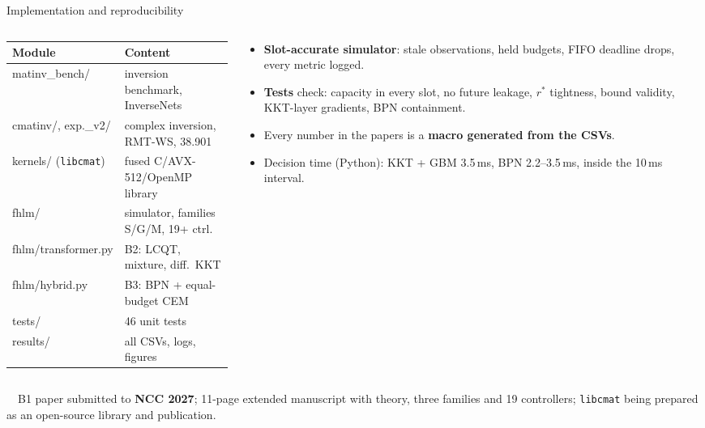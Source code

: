 \documentclass[aspectratio=169,10pt,xcolor={table,dvipsnames}]{beamer}
\newcommand{\rstar}{r^{\ast}}
\begin{document}
\begin{frame}{Implementation and reproducibility}
\begin{columns}[T]
\begin{column}{0.53\textwidth}
\scriptsize
\renewcommand{\arraystretch}{1.15}
\setlength{\tabcolsep}{3pt}
\begin{tabular}{>{\ttfamily}p{2.75cm} p{4.4cm}}
\toprule
\normalfont Module & Content \\
\midrule
matinv\_bench/ & inversion benchmark, InverseNets \\
cmatinv/, exp.\_v2/ & complex inversion, RMT-WS, 38.901 \\
kernels/ (\texttt{libcmat}) & fused C/AVX-512/OpenMP library \\
fhlm/ & simulator, families S/G/M, 19+ ctrl. \\
fhlm/transformer.py & B2: LCQT, mixture, diff.\ KKT \\
fhlm/hybrid.py & B3: BPN + equal-budget CEM \\
tests/ & 46 unit tests \\
results/ & all CSVs, logs, figures \\
\bottomrule
\end{tabular}
\end{column}
\begin{column}{0.45\textwidth}
\footnotesize
\begin{itemize}
  \item \textbf{Slot-accurate simulator}: stale observations, held budgets, FIFO deadline drops, every metric logged.
  \item \textbf{Tests} check: capacity in every slot, no future leakage, $\rstar$ tightness, bound validity, KKT-layer gradients, BPN containment.
  \item Every number in the papers is a \textbf{macro generated from the CSVs}.
  \item Decision time (Python): KKT + GBM 3.5\,ms, BPN 2.2--3.5\,ms, inside the 10\,ms interval.
\end{itemize}
\end{column}
\end{columns}
\vspace{0.3em}
\begin{takeaway}
\ \ B1 paper submitted to \textbf{NCC 2027}; 11-page extended manuscript with theory, three families and 19 controllers; \texttt{libcmat} being prepared as an open-source library and publication.
\end{takeaway}
\end{frame}
\end{document}
